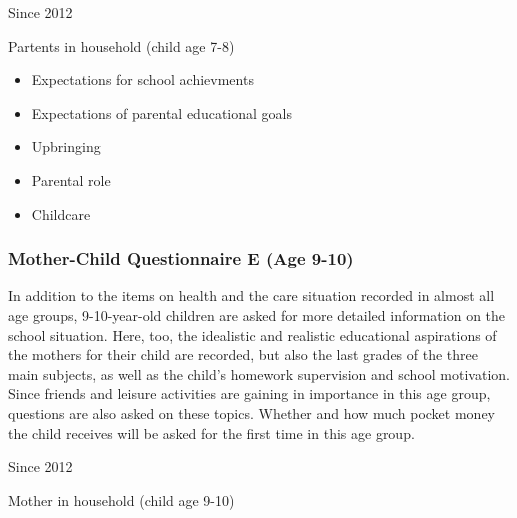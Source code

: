 \documentclass[letterpaper,10pt,openany,onesideH,english]{sphinxmanual}
\begin{document}
 Since 2012

 Partents in household (child age 7-8)

\begin{itemize}
\item {} 
Expectations for school achievments

\item {} 
Expectations of parental educational goals

\item {} 
Upbringing

\item {} 
Parental role

\item {} 
Childcare

\end{itemize}


\subsubsection{Mother-Child Questionnaire E (Age 9-10)}
\label{\detokenize{Contents of SOEPcore/index:mother-child-questionnaire-e-age-9-10}}\label{\detokenize{Contents of SOEPcore/index:mother-child-questionnaire-e}}
In addition to the items on health and the care situation recorded in almost all age groups, 9-10-year-old children are asked for more detailed information on the school situation. Here, too, the idealistic and realistic educational aspirations of the mothers for their child are recorded, but also the last grades of the three main subjects, as well as the child’s homework supervision and school motivation. Since friends and leisure activities are gaining in importance in this age group, questions are also asked on these topics. Whether and how much pocket money the child receives will be asked for the first time in this age group.

 Since 2012

 Mother in household (child age 9-10)
\end{document}
